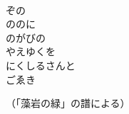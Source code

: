 \documentclass[10pt,b5j]{tarticle} %
\begin{document}
\begin{enumerate}
\begin{minipage}[c]{\blocksize}
        \vspace{\linespace}
        \item~\\
        ぞの\\
        ののに\\
        のがびの\\
        やえゆくを\\
        にくしるさんと\\
        ごゑき %
        
    \end{minipage}
\end{enumerate} %

\begin{flushright}
    （「藻岩の緑」の譜による）
\end{flushright}
    
\end{document}
